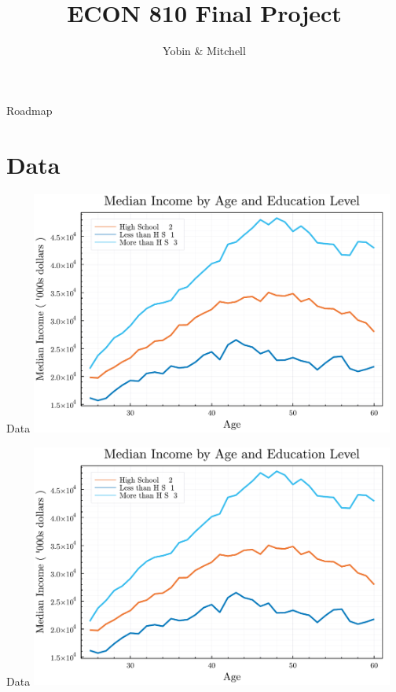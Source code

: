 \documentclass[notes, 10pt]{beamer}
\title{ECON 810 Final Project}
\date{\displaydate{duedate}}
\author{Yobin  \& Mitchell}
\begin{document}
	\begin{frame}
		\maketitle
	\end{frame}

	\begin{frame}{Roadmap}
		\tableofcontents
	\end{frame}
	
	\section{Data}
	\begin{frame}{Data}
        \centering
        \includegraphics[width=12cm]{Figures/fig_median_income_by_age_and_education.pdf}
	\end{frame}
	\begin{frame}{Data}
        \centering
        \includegraphics[width=12cm]{Figures/fig_median_income_by_age_and_education.pdf}
	\end{frame}
	
\end{document}
